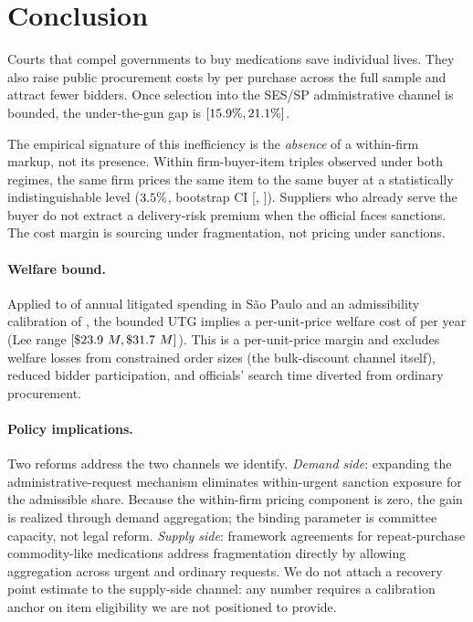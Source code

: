 \section{Conclusion}
\label{sec:conclusion}

Courts that compel governments to buy medications save individual
lives. They also raise public procurement costs by
\BPnegPctHeadline{} per purchase across the full sample and attract
\BPfirmsPctHeadline{} fewer bidders. Once selection into the SES/SP
administrative channel is bounded, the under-the-gun gap is
$[15.9\%, 21.1\%]$.

The empirical signature of this inefficiency is the \emph{absence}
of a within-firm markup, not its presence. Within firm-buyer-item
triples observed under both regimes, the same firm prices the same
item to the same buyer at a statistically indistinguishable level
($3.5\%$, bootstrap CI [\BPutgWithinCIlow,
\BPutgWithinCIhigh]). Suppliers who already serve the buyer do not
extract a delivery-risk premium when the official faces sanctions.
The cost margin is sourcing under fragmentation, not pricing under
sanctions.

\paragraph{Welfare bound.}
Applied to \BPwelfareBoundAnnualSpend{} of annual litigated
spending in S\~ao Paulo and an admissibility calibration of
\BPwelfareBoundAdmissibility, the bounded UTG implies a
per-unit-price welfare cost of \BPwelfareBound{} per year (Lee
range $[\$23.9~M, \$31.7~M]$). This is a
per-unit-price margin and excludes welfare losses from constrained
order sizes (the bulk-discount channel itself), reduced bidder
participation, and officials' search time diverted from ordinary
procurement.

\paragraph{Policy implications.}
Two reforms address the two channels we identify. \emph{Demand
side}: expanding the administrative-request mechanism eliminates
within-urgent sanction exposure for the admissible share. Because
the within-firm pricing component is zero, the gain is realized
through demand aggregation; the binding parameter is committee
capacity, not legal reform. \emph{Supply side}: framework agreements
for repeat-purchase commodity-like medications address fragmentation
directly by allowing aggregation across urgent and ordinary requests.
We do not attach a recovery point estimate to the supply-side channel:
any number requires a calibration anchor on item eligibility we are
not positioned to provide.

